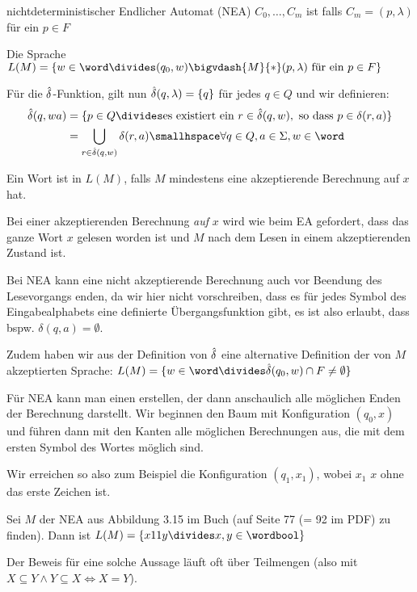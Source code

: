 \begin{definition}[]{nichtdeterministischer Endlicher Automat (NEA)}
    $C_0, \ldots, C_m$ ist  falls $C_m = (p, \lambda)$ für ein $p \in F$

    Die Sprache $L(M) = \{ w \in \word \divides (q_0, w) \bigvdash{M}{*} (p, \lambda) \text{ für ein } p \in F \}$

    Für die $\hat{\delta}$-Funktion, gilt nun $\hat{\delta}(q, \lambda) = \{ q \}$ für jedes $q \in Q$ und wir definieren:
    \begin{align*}
        \hdelta(q, wa) & = \{ p \in Q \divides \text{es existiert ein } r \in \hdelta(q, w), \text{ so dass } p \in \delta(r, a) \} \\
                       & = \bigcup_{r \in \hdelta(q, w)} \delta(r, a) \smallhspace \forall q \in Q, a \in \Sigma, w \in \word
    \end{align*}
\end{definition}
Ein Wort ist in $L(M)$, falls $M$ mindestens eine akzeptierende Berechnung auf $x$ hat.

Bei einer akzeptierenden Berechnung \textit{auf} $x$ wird wie beim EA gefordert, dass das ganze Wort $x$ gelesen worden ist und $M$ nach dem Lesen in einem akzeptierenden Zustand ist.

Bei NEA kann eine nicht akzeptierende Berechnung auch vor Beendung des Lesevorgangs enden, da wir hier nicht vorschreiben,
dass es für jedes Symbol des Eingabealphabets eine definierte Übergangsfunktion gibt, es ist also erlaubt, dass bspw. $\delta(q, a) = \emptyset$.

Zudem haben wir aus der Definition von $\hat{\delta}$ eine alternative Definition der von $M$ akzeptierten Sprache:
$L(M) = \{ w \in \word \divides \hdelta(q_0, w) \cap F \neq \emptyset \}$

Für NEA kann man einen  erstellen, der dann anschaulich alle möglichen Enden der Berechnung darstellt.
Wir beginnen den Baum mit Konfiguration $(q_0, x)$ und führen dann mit den Kanten alle möglichen Berechnungen aus, die mit dem ersten Symbol des Wortes möglich sind.

Wir erreichen so also zum Beispiel die Konfiguration $(q_1, x_1)$, wobei $x_1$ $x$ ohne das erste Zeichen ist.


 Sei $M$ der NEA aus Abbildung 3.15 im Buch (auf Seite 77 (= 92 im PDF) zu finden).
Dann ist $L(M) = \{ x11y \divides x, y \in \wordbool \}$

Der Beweis für eine solche Aussage läuft oft über Teilmengen (also mit $X \subseteq Y \land Y \subseteq X \Leftrightarrow X = Y$).


